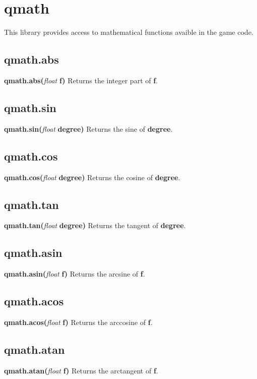 \documentclass{scrreprt}
\begin{document}
\section{qmath}
\label{qmath}
This library provides access to mathematical functions avaible in the game code.
\subsection{qmath.abs}
\label{qm-abs}
\textbf{qmath.abs(}\textit{float}\textbf{ f)}
\newline
Returns the integer part of \textbf{f}.
\subsection{qmath.sin}
\label{qm-sin}
\textbf{qmath.sin(}\textit{float}\textbf{ degree)}
\newline
Returns the sine of \textbf{degree}.
\subsection{qmath.cos}
\label{qm-cos}
\textbf{qmath.cos(}\textit{float}\textbf{ degree)}
\newline
Returns the cosine of \textbf{degree}.
\subsection{qmath.tan}
\label{qm-tan}
\textbf{qmath.tan(}\textit{float}\textbf{ degree)}
\newline
Returns the tangent of \textbf{degree}.
\subsection{qmath.asin}
\label{qm-asin}
\textbf{qmath.asin(}\textit{float}\textbf{ f)}
\newline
Returns the arcsine of \textbf{f}.
\subsection{qmath.acos}
\label{qm-acos}
\textbf{qmath.acos(}\textit{float}\textbf{ f)}
\newline
Returns the arccosine of \textbf{f}.
\subsection{qmath.atan}
\label{qm-atan}
\textbf{qmath.atan(}\textit{float}\textbf{ f)}
\newline
Returns the arctangent of \textbf{f}.
\end{document}
